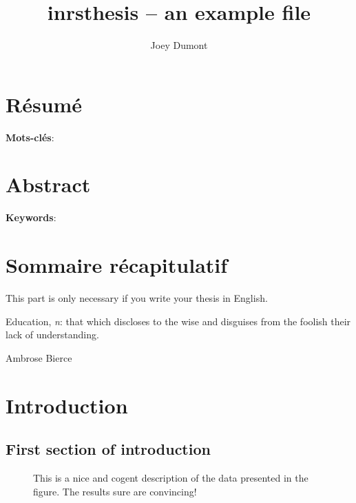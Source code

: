 \documentclass[11pt,SymmetricalJury,PhD]{inrsthesis}
\title{inrsthesis -- an example file}
\author{Joey Dumont}
\begin{document}
\frontmatter

\maketitle

\chapter{Résumé}

\textbf{Mots-clés}:

\chapter{Abstract}

\textbf{Keywords}:

\chapter{Sommaire récapitulatif}

This part is only necessary if you write your thesis in English.

\cleardoublepage

\tableofcontents
\cleardoublepage

\listoftables
\cleardoublepage

\listoffigures
\cleardoublepage

\dedication{I dedicate this to Mufasa, the God of Lions.}
\cleardoublepage

\epigraph{Education, \textit{n}: that which discloses to the wise and disguises
from the foolish their lack of understanding.}{Ambrose Bierce}

\cleardoublepage

\mainmatter

\chapter{Introduction}

\lipsum[1]

\section{First section of introduction}

\lipsum[2]

\begin{figure}
  \centering
  \caption[Caption goes here.]{This is a nice and cogent description
           of the data presented in the figure. The results sure are
           convincing!}
  \label{fig:test}
\end{figure}
\end{document}
